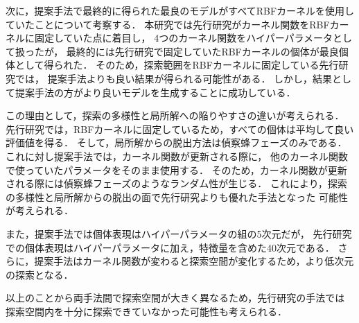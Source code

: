 次に，提案手法で最終的に得られた最良のモデルがすべてRBFカーネルを使用していたことについて考察する．
本研究では先行研究がカーネル関数をRBFカーネルに固定していた点に着目し，
4つのカーネル関数をハイパーパラメータとして扱ったが，
最終的には先行研究で固定していたRBFカーネルの個体が最良個体として得られた．
そのため，探索範囲をRBFカーネルに固定している先行研究では，
提案手法よりも良い結果が得られる可能性がある．
しかし，結果として提案手法の方がより良いモデルを生成することに成功している．

この理由として，探索の多様性と局所解への陥りやすさの違いが考えられる．
先行研究では，RBFカーネルに固定しているため，すべての個体は平均して良い評価値を得る．
そして，局所解からの脱出方法は偵察蜂フェーズのみである．
これに対し提案手法では，カーネル関数が更新される際に，
他のカーネル関数で使っていたパラメータをそのまま使用する．
そのため，カーネル関数が更新される際には偵察蜂フェーズのようなランダム性が生じる．
これにより，探索の多様性と局所解からの脱出の面で先行研究よりも優れた手法となった
可能性が考えられる．

また，提案手法では個体表現はハイパーパラメータの組の5次元だが，
先行研究での個体表現はハイパーパラメータに加え，特徴量を含めた40次元である．
さらに，提案手法はカーネル関数が変わると探索空間が変化するため，より低次元の探索となる．

以上のことから両手法間で探索空間が大きく異なるため，先行研究の手法では
探索空間内を十分に探索できていなかった可能性も考えられる．